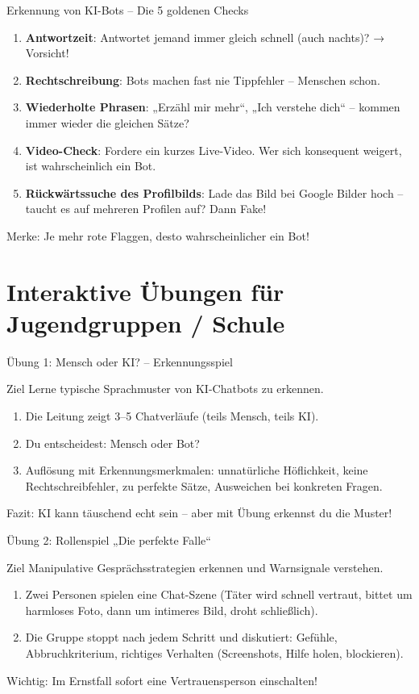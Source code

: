 \documentclass[10pt,aspectratio=169]{beamer}
\begin{document}
	\begin{frame}{Erkennung von KI-Bots – Die 5 goldenen Checks}
		\begin{enumerate}
			\item \textbf{Antwortzeit}: Antwortet jemand immer gleich schnell (auch nachts)? → Vorsicht!
			\item \textbf{Rechtschreibung}: Bots machen fast nie Tippfehler – Menschen schon.
			\item \textbf{Wiederholte Phrasen}: „Erzähl mir mehr“, „Ich verstehe dich“ – kommen immer wieder die gleichen Sätze?
			\item \textbf{Video-Check}: Fordere ein kurzes Live-Video. Wer sich konsequent weigert, ist wahrscheinlich ein Bot.
			\item \textbf{Rückwärtssuche des Profilbilds}: Lade das Bild bei Google Bilder hoch – taucht es auf mehreren Profilen auf? Dann Fake!
		\end{enumerate}
		\alert{Merke: Je mehr rote Flaggen, desto wahrscheinlicher ein Bot!}
	\end{frame}
	
	\section{Interaktive Übungen für Jugendgruppen / Schule}
	\begin{frame}{Übung 1: Mensch oder KI? – Erkennungsspiel}
		\begin{block}{Ziel}
			Lerne typische Sprachmuster von KI-Chatbots zu erkennen.
		\end{block}
		\begin{enumerate}
			\item Die Leitung zeigt 3–5 Chatverläufe (teils Mensch, teils KI).
			\item Du entscheidest: Mensch oder Bot?
			\item Auflösung mit Erkennungsmerkmalen: unnatürliche Höflichkeit, keine Rechtschreibfehler, zu perfekte Sätze, Ausweichen bei konkreten Fragen.
		\end{enumerate}
		\alert{Fazit:} KI kann täuschend echt sein – aber mit Übung erkennst du die Muster!
	\end{frame}
	
	\begin{frame}{Übung 2: Rollenspiel „Die perfekte Falle“}
		\begin{block}{Ziel}
			Manipulative Gesprächsstrategien erkennen und Warnsignale verstehen.
		\end{block}
		\begin{enumerate}
			\item Zwei Personen spielen eine Chat-Szene (Täter wird schnell vertraut, bittet um harmloses Foto, dann um intimeres Bild, droht schließlich).
			\item Die Gruppe stoppt nach jedem Schritt und diskutiert: Gefühle, Abbruchkriterium, richtiges Verhalten (Screenshots, Hilfe holen, blockieren).
		\end{enumerate}
		\alert{Wichtig:} Im Ernstfall sofort eine Vertrauensperson einschalten!
	\end{frame}
	
\end{document}
